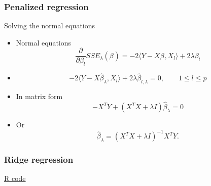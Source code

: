 \documentclass[handout]{beamer}
\newcommand{\B}[1]{\beta_{#1}}
\newcommand{\Bh}[1]{\widehat{\beta}_{#1}}
\begin{document}
   \begin{frame} \frametitle{Penalized regression}

   \begin{block}
       {Solving the normal equations}
       \begin{itemize}
   \item Normal equations
   $$
   \frac{\partial}{\partial \B{l}} SSE_{\lambda}(\B{}) = -2  \langle Y - X\B{}, X_l \rangle + 2 \lambda \B{l}$$

       \item $$
   -2 \langle Y - X\Bh{\lambda}, X_l \rangle + 2 \lambda \Bh{l,\lambda} = 0, \qquad 1 \leq l \leq p$$

   \item In matrix form
   $$
   -X^TY +  (X^TX + \lambda I) \Bh{\lambda} = 0$$

   \item Or
   $$
   \Bh{\lambda} = (X^TX + \lambda I)^{-1} X^TY.$$
       \end{itemize}

   \end{block}
   \end{frame}



   \begin{frame}
   \frametitle{Ridge regression}
   \begin{center}
   \end{center}
   \href{http://www.stanford.edu/class/stats191/penalized.html#ridge-regression}{R code}
   \end{frame}

\end{document}
